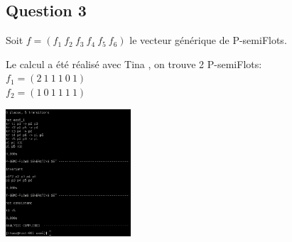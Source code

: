 \subsection{Question 3}
Soit $f=(f_1\ f_2\ f_3\ f_4\ f_5\ f_6)$ le vecteur générique de P-semiFlots.\\
\begin{center}
Le calcul a été réalisé avec Tina , on trouve 2 P-semiFlots: \\
$f_1 = (2\ 1\ 1\ 1\ 0\ 1)$\\
$f_2 = (1\ 0\ 1\ 1\ 1\ 1)$

\vspace{0.5cm}

\includegraphics[width=0.35\textwidth]{images/screenTinaExo5.png}\\
\end{center}